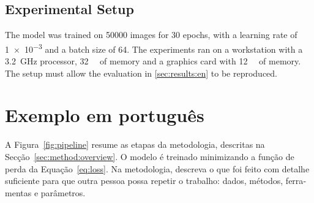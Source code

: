\subsection{Experimental Setup}
\label{sec:method:setup}

The model was trained on \num{50000} images for \num{30} epochs, with a
learning rate of \num{1e-3} and a batch size of \num{64}. The experiments ran
on a workstation with a \qty{3.2}{\giga\hertz} processor, \qty{32}{\giga\byte}
of memory and a graphics card with \qty{12}{\giga\byte} of memory. The setup
must allow the evaluation in \cref{sec:results:en} to be reproduced.

\section{Exemplo em português}
\label{sec:method:pt}

\begin{otherlanguage}{portuguese}

A Figura~\ref{fig:pipeline} resume as etapas da metodologia, descritas na
Secção~\ref{sec:method:overview}. O modelo é treinado minimizando a função
de perda da Equação~\eqref{eq:loss}. Na metodologia, descreva o que foi feito
com detalhe suficiente para que outra pessoa possa repetir o trabalho:
dados, métodos, ferramentas e parâmetros.

\end{otherlanguage}

